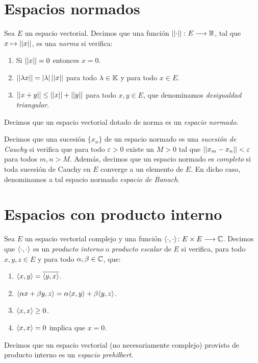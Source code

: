 \section{Espacios normados}

\begin{definition} \label{def:def23} Sea $E$ un espacio vectorial. Decimos que una función $\left|\left|\cdot\right|\right|\colon E\longrightarrow \mathbb{R}$, tal que $x\mapsto\left|\left|x\right|\right|$, es una \textit{norma} si verifica:
\begin{enumerate}[label=\alph*)]
\item Si $\left|\left|x\right|\right|=0$ entonces $x=0$.
\item $\left|\left|\lambda x\right|\right|=|\lambda|\left|\left|x\right|\right|$ para todo $\lambda\in\mathbb{K}$ y para todo $x\in E$.
\item $\left|\left|x+y\right|\right|\leq \left|\left|x\right|\right| + \left|\left|y\right|\right|$ para todo $x,y\in E$, que denominamos \textit{desigualdad triangular}.
\end{enumerate}
Decimos que  un espacio vectorial dotado de norma es un \textit{espacio normado}.

Decimos que una sucesión $\{x_n\}$ de un espacio normado  es una \textit{sucesión de Cauchy} si verifica que para todo $\varepsilon>0$ existe un $M>0$ tal que $\left|\left|x_m-x_n\right|\right|<\varepsilon$ para todos $m,n>M$.
%
Además, decimos que  un espacio normado es \textit{completo} si toda sucesión de Cauchy en $E$ converge a un elemento de $E$. En dicho caso, denominamos a tal espacio normado \textit{espacio de Banach}.
\end{definition}

\section{Espacios con producto interno}

\begin{definition} Sea $E$ un espacio vectorial complejo y una función $\langle\cdot,\cdot\rangle\colon E\times E\longrightarrow \mathbb{C}$. Decimos que $\langle\cdot,\cdot\rangle$ es un \textit{producto interno} o \textit{producto escalar} de $E$ si verifica, para todo $x,y,z\in E$ y para todo $\alpha,\beta\in\mathbb{C}$, que:
\begin{enumerate}[label=\alph*)]
\item $\langle x,y\rangle=\overline{\langle y,x\rangle}$.
\item $\langle\alpha x + \beta y,z\rangle= \alpha \langle x,y\rangle + \beta \langle y,z\rangle$.
\item $\langle x,x\rangle\geq 0$.
\item $\langle x,x\rangle= 0$ implica que $x=0$.
\end{enumerate}

Decimos que un espacio vectorial (no necesariamente complejo) provisto de producto interno es un  \textit{espacio prehilbert}.
\end{definition}

